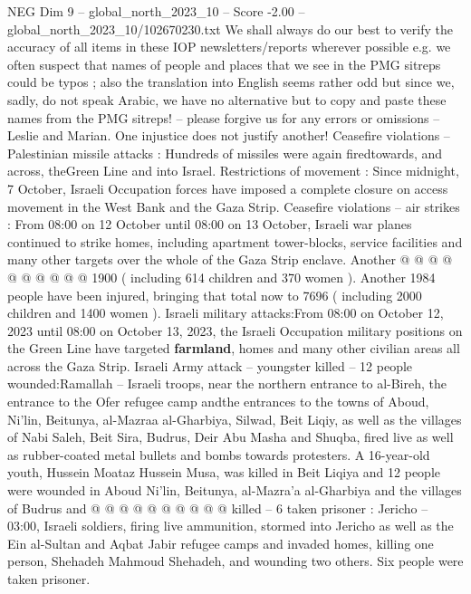 \begin{textsample}{NEG Dim 9 – global\_north\_2023\_10 – Score -2.00 – global\_north\_2023\_10/102670230.txt}  \label{ex:f9_neg_151}
We shall always do our best to verify the accuracy of all items in these IOP newsletters/reports wherever possible e.g. we often suspect that names of people and places that we see in the PMG sitreps could be typos ; also the translation into English seems rather odd but since we, sadly, do not speak Arabic, we have no alternative but to copy and paste these names from the PMG sitreps! -- please forgive us for any errors or omissions -- Leslie and Marian.
One injustice does not justify another!
Ceasefire violations -- Palestinian missile attacks : Hundreds of missiles were again firedtowards, and across, theGreen Line and into Israel.
Restrictions of movement : Since midnight, 7 October, Israeli Occupation forces have imposed a complete closure on access movement in the West Bank and the Gaza Strip.
Ceasefire violations -- air strikes : From 08:00 on 12 October until 08:00 on 13 October, Israeli war planes continued to strike homes, including apartment tower-blocks, service facilities and many other targets over the whole of the Gaza Strip enclave.
Another @ @ @ @ @ @ @ @ @ @ 1900 ( including 614 children and 370 women ).
Another 1984 people have been injured, bringing that total now to 7696 ( including 2000 children and 1400 women ).
Israeli military attacks:From 08:00 on October 12, 2023 until 08:00 on October 13, 2023, the Israeli Occupation military positions on the Green Line have targeted \textbf{farmland}, homes and many other civilian areas all across the Gaza Strip.
Israeli Army attack -- youngster killed -- 12 people wounded:Ramallah -- Israeli troops, near the northern entrance to al-Bireh, the entrance to the Ofer refugee camp andthe entrances to the towns of Aboud, Ni'lin, Beitunya, al-Mazraa al-Gharbiya, Silwad, Beit Liqiy, as well as the villages of Nabi Saleh, Beit Sira, Budrus, Deir Abu Masha and Shuqba, fired live as well as rubber-coated metal bullets and bombs towards protesters.
A 16-year-old youth, Hussein Moataz Hussein Musa, was killed in Beit Liqiya and 12 people were wounded in Aboud Ni'lin, Beitunya, al-Mazra'a al-Gharbiya and the villages of Budrus and @ @ @ @ @ @ @ @ @ @ killed -- 6 taken prisoner : Jericho -- 03:00, Israeli soldiers, firing live ammunition, stormed into Jericho as well as the Ein al-Sultan and Aqbat Jabir refugee camps and invaded homes, killing one person, Shehadeh Mahmoud Shehadeh, and wounding two others.
Six people were taken prisoner.

\end{textsample}
